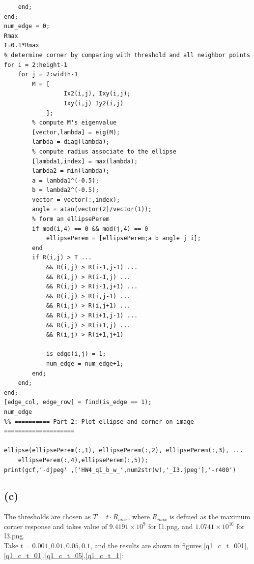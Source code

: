 \documentclass[letterpaper]{article}
\begin{document}
\begin{lstlisting}
    end;
end;
num_edge = 0;
Rmax
T=0.1*Rmax
% determine corner by comparing with threshold and all neighbor points
for i = 2:height-1
    for j = 2:width-1
        M = [
                 Ix2(i,j), Ixy(i,j);
                 Ixy(i,j) Iy2(i,j)
            ];
        % compute M's eigenvalue
        [vector,lambda] = eig(M);
        lambda = diag(lambda);
        % compute radius associate to the ellipse
        [lambda1,index] = max(lambda);
        lambda2 = min(lambda);
        a = lambda1^(-0.5);
        b = lambda2^(-0.5);
        vector = vector(:,index);
        angle = atan(vector(2)/vector(1));
        % form an ellipsePerem
        if mod(i,4) == 0 && mod(j,4) == 0
            ellipsePerem = [ellipsePerem;a b angle j i];
        end
        if R(i,j) > T ...
            && R(i,j) > R(i-1,j-1) ...
            && R(i,j) > R(i-1,j) ...
            && R(i,j) > R(i-1,j+1) ...
            && R(i,j) > R(i,j-1) ...
            && R(i,j) > R(i,j+1) ...
            && R(i,j) > R(i+1,j-1) ...
            && R(i,j) > R(i+1,j) ...
            && R(i,j) > R(i+1,j+1)

            is_edge(i,j) = 1;
            num_edge = num_edge+1;
        end;
    end;
end;
[edge_col, edge_row] = find(is_edge == 1);
num_edge
%% ========== Part 2: Plot ellipse and corner on image ====================

ellipse(ellipsePerem(:,1), ellipsePerem(:,2), ellipsePerem(:,3), ...
    ellipsePerem(:,4),ellipsePerem(:,5));
print(gcf,'-djpeg' ,['HW4_q1_b_w_',num2str(w),'_I3.jpeg'],'-r400')
\end{lstlisting}

\subsection*{(c)}
The thresholds are chosen as $T = t\cdot R_{max}$, where $R_{max}$ is defined as the maximum corner response and takes value of $9.4191\times 10^9$ for I1.png, and $1.0741\times 10^{10}$ for I3.png.\\

Take $t = 0.001, 0.01, 0.05, 0.1$, and the results are shown in figures \ref{q1_c_t_001},\ref{q1_c_t_01},\ref{q1_c_t_05},\ref{q1_c_t_1}:\\
\end{document}
